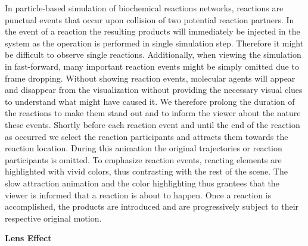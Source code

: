 In particle-based simulation of biochemical reactions networks, reactions are punctual events that occur upon collision of two potential reaction partners.
In the event of a reaction the resulting products will immediately be injected in the system as the operation is performed in single simulation step.
Therefore it might be difficult to observe single reactions.
Additionally, when viewing the simulation in fast-forward, many important reaction events might be simply omitted due to frame dropping.
Without showing reaction events, molecular agents will appear and disappear from the visualization without providing the necessary visual clues to understand what might have caused it.
We therefore prolong the duration of the reactions to make them stand out and to inform the viewer about the nature these events.
Shortly before each reaction event and until the end of the reaction as occurred we select the reaction participants and attracts them towards the reaction location.
During this animation the original trajectories or reaction participants is omitted.
To emphasize reaction events, reacting elements are highlighted with vivid colors, thus contrasting with the rest of the scene.
The slow attraction animation and the color highlighting thus grantees that the viewer is informed that a reaction is about to happen.
Once a reaction is accomplished, the products are introduced and are progressively subject to their respective original motion.

\textbf{Lens Effect}

